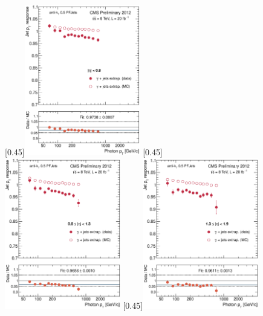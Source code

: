 \begin{figure}[p]
    \centering
    \subcaptionbox{\label{fig:bal_extrap_eta008}}[0.45\textwidth]{\includegraphics[width=0.45\textwidth]{chapitre4/figs/resp_balancing_extrap/response_eta008_balancing_extrap.eps}}\hfill
    \subcaptionbox{\label{fig:bal_extrap_eta0813}}[0.45\textwidth]{\includegraphics[width=0.45\textwidth]{chapitre4/figs/resp_balancing_extrap/response_eta0813_balancing_extrap.eps}}
    \subcaptionbox{\label{fig:bal_extrap_eta1319}}[0.45\textwidth]{\includegraphics[width=0.45\textwidth]{chapitre4/figs/resp_balancing_extrap/response_eta1319_balancing_extrap.eps}}\hfill

\end{figure}
